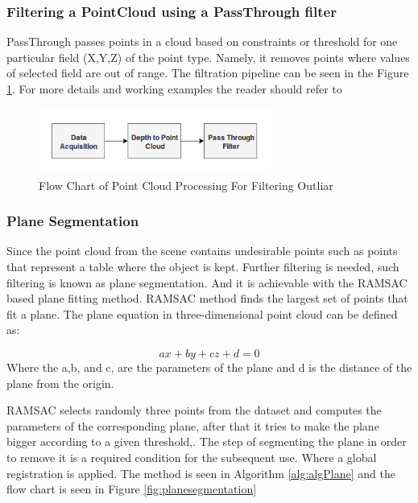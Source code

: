 \subsubsection{Filtering a PointCloud using a PassThrough filter}

PassThrough passes points in a cloud based on constraints or threshold for one particular field (X,Y,Z) of the point type. Namely, it removes points where values of selected field are out of range. The filtration pipeline can be seen in the Figure \ref{fig:passthrough}. For more details and working examples the reader should refer to \cite{pcl}

\begin{figure}[!h]
\begin{center}
\includegraphics[width=3in]{diagrams/passthrough.png}
\caption{Flow Chart of Point Cloud Processing For Filtering Outliar}%
\label{fig:passthrough}
\end{center}
\end{figure}


\subsubsection{Plane Segmentation}

Since the point cloud from the scene contains undesirable points such as points that represent a table where the object is kept. Further filtering is needed, such filtering is known as plane segmentation. And it is achievable with the RAMSAC based plane fitting method. RAMSAC method finds the largest set of points that fit a plane. The plane equation in three-dimensional point cloud can be defined as:

\begin{equation}
    ax+by+cz+d=0
\end{equation}
Where the a,b, and c, are the parameters of the plane and d is the distance of the plane from the origin.

RAMSAC selects randomly three points from the dataset and computes the parameters of the corresponding plane, after that it tries to make the plane bigger according to a given threshold,\cite{algPlane}. The step of segmenting the plane in order to remove it is a required condition for the subsequent use. Where a global registration is applied.  The method is seen in Algorithm \ref{alg:algPlane} and the flow chart is seen in Figure \ref{fig:planesegmentation}  

